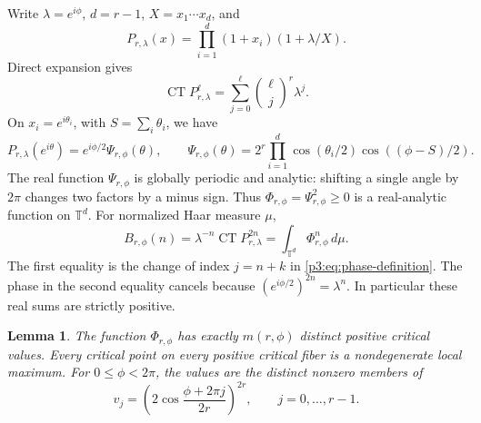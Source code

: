 \documentclass[11pt,a4paper]{article}
\newtheorem{lemma}[theorem]{Lemma}
\theoremstyle{definition}
\theoremstyle{remark}
\numberwithin{equation}{section}
\begin{document}
Write $\lambda=e^{i\phi}$, $d=r-1$, $X=x_1\cdots x_d$, and
\[
 P_{r,\lambda}(x)=\prod_{i=1}^{d}(1+x_i)(1+\lambda/X).
\]
Direct expansion gives
\begin{equation}\label{p3:eq:phase-constant-term}
 \operatorname{CT}P_{r,\lambda}^{\ell}
 =\sum_{j=0}^{\ell}\binom{\ell}{j}^{r}\lambda^j.
\end{equation}
On $x_i=e^{i\theta_i}$, with $S=\sum_i\theta_i$, we have
\begin{equation}\label{p3:eq:phase-real-torus}
 P_{r,\lambda}(e^{i\theta})=e^{i\phi/2}\Psi_{r,\phi}(\theta),
 \qquad
 \Psi_{r,\phi}(\theta)
 =2^r\prod_{i=1}^{d}\cos(\theta_i/2)
                 \cos((\phi-S)/2).
\end{equation}
The real function $\Psi_{r,\phi}$ is globally periodic and analytic:
shifting a single angle by $2\pi$ changes two factors by a minus
sign. Thus $\Phi_{r,\phi}=\Psi_{r,\phi}^2\geq0$ is a real-analytic
function on $\mathbb T^d$. For normalized Haar measure $\mu$,
\begin{equation}\label{p3:eq:phase-moments}
 B_{r,\phi}(n)
 =\lambda^{-n}\operatorname{CT}P_{r,\lambda}^{2n}
 =\int_{\mathbb T^d}\Phi_{r,\phi}^{n}\,d\mu.
\end{equation}
The first equality is the change of index $j=n+k$ in
\eqref{p3:eq:phase-definition}. The phase in the second equality
cancels because $(e^{i\phi/2})^{2n}=\lambda^n$.
In particular these real sums are strictly positive.

\begin{lemma}\label{p3:lem:phase-critical}
The function $\Phi_{r,\phi}$ has exactly $m(r,\phi)$ distinct positive
critical values. Every critical point on every positive critical
fiber is a nondegenerate local maximum.
For $0\leq\phi<2\pi$, the values are the distinct nonzero members of
\begin{equation}\label{p3:eq:phase-values}
 v_j=\left(2\cos\frac{\phi+2\pi j}{2r}\right)^{2r},
 \qquad j=0,\ldots,r-1.
\end{equation}
\end{lemma}
\end{document}
